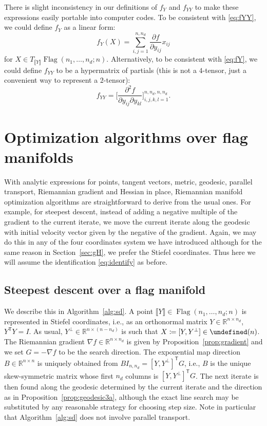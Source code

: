 \documentclass[11pt,reqno]{amsart}%
\theoremstyle{definition}
\theoremstyle{remark}
\newcommand{\tp}{{\scriptscriptstyle\mathsf{T}}}
\newcommand{\lb}{\llbracket}
\newcommand{\rb}{\rrbracket}
\let\O\undefined
\DeclareMathOperator{\Flag}{Flag}
\DeclareMathOperator{\O}{O}
\begin{document}
There is slight inconsistency in our definitions of $f_Y$ and $f_{YY}$ to make these expressions easily portable into computer codes. To be consistent with \eqref{eq:fYY}, we could define $f_Y$ as a linear form:
\[
f_Y(X) = \sum_{i,j=1}^{n,n_d} \frac{\partial f}{\partial y_{ij}}  x_{ij}
\]
for $X \in  T_{\lb Y \rb} \Flag(n_1,\dots,n_d;n)$. Alternatively, to be consistent with \eqref{eq:fY}, we could define $f_{YY}$ to be a hypermatrix of partials (this is not a $4$-tensor, just a convenient way to represent a $2$-tensor):
\[
f_{YY} =\biggl[ \frac{\partial^2 f}{\partial y_{ij} \partial y_{kl}} \biggr]_{i,j,k,l=1}^{n,n_d, n, n_d}.
\]

\section{Optimization algorithms over flag manifolds}\label{sec:optim}

With analytic expressions for points, tangent vectors, metric, geodesic, parallel transport, Riemannian gradient and Hessian in place, Riemannian manifold optimization algorithms are straightforward to derive from the usual ones. For example, for steepest descent, instead of adding a negative multiple of the gradient to the current iterate, we move the current iterate along the geodesic with initial velocity vector given by the negative of the gradient. Again, we may do this in any of the four coordinates system we have introduced although for the same reason in Section~\ref{sec:gH}, we prefer the Stiefel coordinates. Thus here we will assume the identification \eqref{eq:identify} as before.


\subsection{Steepest descent over a flag manifold}

We describe this in Algorithm~\ref{alg:sd}. A point $\lb Y \rb \in \Flag(n_1,\dots,n_d;n)$ is represented in Stiefel coordinates, i.e., as an orthonormal matrix $Y \in \mathbb{R}^{n \times n_d}$, $Y^\tp Y=I$. As usual, $Y^{\perp} \in \mathbb{R}^{n \times (n-n_d)}$ is such that $X \coloneqq [ Y, Y^{\perp}] \in \O(n)$. The Riemannian gradient $\nabla f \in \mathbb{R}^{n \times n_d}$ is given by Proposition~\ref{prop:gradient} and we set $G = - \nabla f$ to be the search direction. 
The exponential map direction $B\in \mathbb{R}^{n\times n}$ is uniquely obtained from $B I_{n,n_d} = [Y,Y^{\perp}]^\tp G$, i.e., $B$ is the unique skew-symmetric matrix whose first $n_d$ columns is  $[Y,Y^{\perp}]^\tp G$. The next iterate is then found along the geodesic determined by the current iterate and the direction as in Proposition~\ref{prop:geodesic3a}, although the exact line search may be substituted by any reasonable strategy for choosing step size. Note in particular that Algorithm~\ref{alg:sd} does not involve parallel transport.
\end{document}
